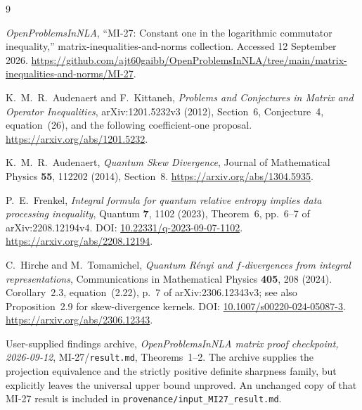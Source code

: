 \documentclass[11pt]{article}
\numberwithin{equation}{section}
\theoremstyle{remark}
\begin{document}
\begin{thebibliography}{9}
\raggedright
{}
\emph{OpenProblemsInNLA}, ``MI-27: Constant one in the logarithmic
commutator inequality,'' matrix-inequalities-and-norms collection.
Accessed 12 September 2026.
\url{https://github.com/ajt60gaibb/OpenProblemsInNLA/tree/main/matrix-inequalities-and-norms/MI-27}.

K.~M.~R.~Audenaert and F.~Kittaneh,
\emph{Problems and Conjectures in Matrix and Operator Inequalities},
arXiv:1201.5232v3 (2012), Section~6, Conjecture~4, equation~(26),
and the following coefficient-one proposal.
\url{https://arxiv.org/abs/1201.5232}.

K.~M.~R.~Audenaert,
\emph{Quantum Skew Divergence},
Journal of Mathematical Physics \textbf{55}, 112202 (2014), Section~8.
\url{https://arxiv.org/abs/1304.5935}.

P.~E.~Frenkel,
\emph{Integral formula for quantum relative entropy implies data
processing inequality},
Quantum \textbf{7}, 1102 (2023), Theorem~6, pp.~6--7 of arXiv:2208.12194v4.
DOI: \href{https://doi.org/10.22331/q-2023-09-07-1102}{10.22331/q-2023-09-07-1102}.
\url{https://arxiv.org/abs/2208.12194}.

C.~Hirche and M.~Tomamichel,
\emph{Quantum R\'enyi and $f$-divergences from integral representations},
Communications in Mathematical Physics \textbf{405}, 208 (2024).
Corollary~2.3, equation~(2.22), p.~7 of arXiv:2306.12343v3;
see also Proposition~2.9 for skew-divergence kernels.
DOI: \href{https://doi.org/10.1007/s00220-024-05087-3}{10.1007/s00220-024-05087-3}.
\url{https://arxiv.org/abs/2306.12343}.

User-supplied findings archive,
\emph{OpenProblemsInNLA matrix proof checkpoint, 2026-09-12},
MI-27/\texttt{result.md}, Theorems~1--2.
The archive supplies the projection equivalence and the strictly
positive definite sharpness family, but explicitly leaves the universal
upper bound unproved. An unchanged copy of that MI-27 result is included
in \texttt{provenance/input\_MI27\_result.md}.
\end{thebibliography}
\end{document}
